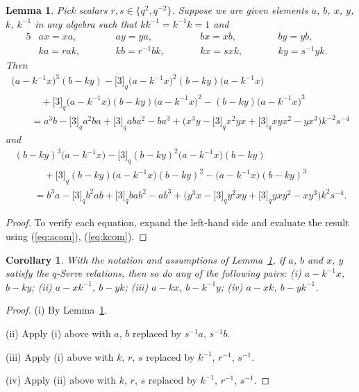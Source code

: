 \documentclass[pdftex]{sigma}
\numberwithin{equation}{section}
\newtheorem{Corollary}[Theorem]{Corollary}
\newtheorem{Lemma}[Theorem]{Lemma}
\begin{document}
\begin{Lemma}\label{lem:fact}
Pick scalars $r,s\in \big\lbrace q^2,q^{-2}\big\rbrace$. Suppose we are given elements $a$, $b$, $x$, $y$, $k$, $k^{-1}$ in any algebra such that $kk^{-1}= k^{-1}k=1$ and
\begin{alignat}{5}
& ax=xa, \qquad&&
ay=ya, \qquad&&
bx=xb, \qquad&&
by=yb,& \label{eq:acom}\\
&ka = rak, \qquad &&
kb = r^{-1} bk, \qquad&&
kx = s xk, \qquad&&
ky = s^{-1} yk.&
\label{eq:kcom}
\end{alignat}
Then
\begin{gather*}
\big(a-k^{-1}x\big)^3 (b-k y)- \lbrack 3 \rbrack_q \big(a-k^{-1}x\big)^2 (b-ky)\big(a-k^{-1}x\big)
\\
\qquad \quad{} + \lbrack 3 \rbrack_q \big(a-k^{-1}x\big) (b-ky)\big(a-k^{-1}x\big)^2 -
(b-ky)\big(a-k^{-1}x\big)^3 \\
\qquad{} = a^3 b - \lbrack 3 \rbrack_q a^2 b a + \lbrack 3 \rbrack_q a b a^2 -ba^3
 + \big(x^3 y -\lbrack 3 \rbrack_q x^2 yx+\lbrack 3 \rbrack_q xy x^2-yx^3\big) k^{-2} s^{-4}
\end{gather*}
and
\begin{gather*}
(b-ky)^3\big(a-k^{-1} x\big)- \lbrack 3 \rbrack_q (b-ky)^2 \big(a-k^{-1}x\big)(b-ky)\\
\qquad \quad {}+ \lbrack 3 \rbrack_q (b-ky) \big(a-k^{-1}x\big)(b-ky)^2 - \big(a-k^{-1}x\big)(b-ky)^3\\
\qquad{} = b^3 a -\lbrack 3 \rbrack_q b^2 a b+\lbrack 3 \rbrack_q b a b^2-ab^3
 + \big(y^3 x -\lbrack 3 \rbrack_q y^2 xy+\lbrack 3 \rbrack_q y x y^2-xy^3\big) k^2 s^{-4}.
\end{gather*}
\end{Lemma}
\begin{proof} To verify each equation, expand the left-hand side and evaluate the result using
(\ref{eq:acom}), (\ref{eq:kcom}).
\end{proof}

\begin{Corollary}\label{cor:aside}With the notation and assumptions of Lemma~{\rm \ref{lem:fact}}, if $a$, $b$ and $x$, $y$ satisfy the $q$-Serre relations, then so do any of the following pairs: {\rm (i)} $a-k^{-1}x$, $b-ky$;
{\rm (ii)} $a-xk^{-1}$, $b-yk$;
{\rm (iii)} $a-kx$, $b-k^{-1}y$;
{\rm (iv)} $a-xk$, $b-yk^{-1}$.
\end{Corollary}
\begin{proof} (i) By Lemma~\ref{lem:fact}.

(ii) Apply (i) above with $a$, $b$ replaced by $s^{-1}a$, $s^{-1}b$.

(iii) Apply (i) above with $k$, $r$, $s$ replaced by $k^{-1}$, $r^{-1}$, $s^{-1}$.

 (iv) Apply (ii) above with $k$, $r$, $s$ replaced by $k^{-1}$, $r^{-1}$, $s^{-1}$.
\end{proof}
\end{document}

